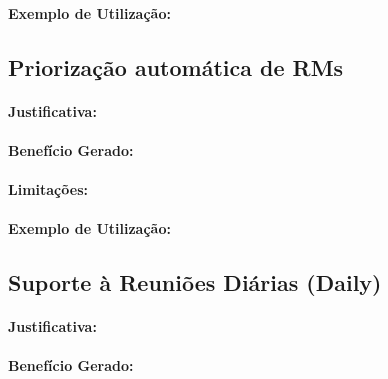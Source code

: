 \paragraph{Exemplo de Utilização:}
\label{par:exemplo_de_utilização_s06}

\subsection{Priorização automática de RMs}
\label{sub:priorizacao_automatica_rms}


\paragraph{Justificativa:}
\label{par:justificativa_s07}

\paragraph{Benefício Gerado:}
\label{par:papéis_afetados_s07}

\paragraph{Limitações:}
\label{par:limitacoes_s07}

\paragraph{Exemplo de Utilização:}
\label{par:exemplo_de_utilização_s07}

\subsection{Suporte à Reuniões Diárias (Daily)}
\label{sub:suporte_reunicao_diarias}


\paragraph{Justificativa:}
\label{par:justificativa_s08}

\paragraph{Benefício Gerado:}
\label{par:papéis_afetados_s08}

